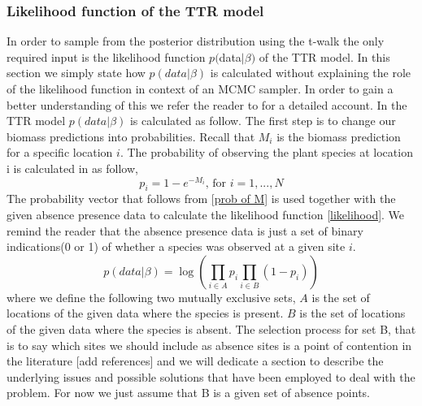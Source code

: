 \documentclass[paper=a4, fontsize=11pt]{scrartcl}
\numberwithin{equation}{section}		%
\numberwithin{figure}{section}			%
\numberwithin{table}{section}				%
\begin{document}
\subsubsection{Likelihood function of the TTR model}
In order to sample from the posterior distribution using the t-walk the only required input is the likelihood function $p($data$|\beta)$ of the TTR model. In this section we simply state how $p(data|\beta)$ is calculated without explaining the role of the likelihood function in context of an MCMC sampler. In order to gain a better understanding of this we refer the reader to \cite{GelmanBayesianAnalysis} for a detailed account. In the TTR model $p(data|\beta)$ is calculated as follow. The first step is to change our biomass predictions into probabilities. Recall that $M_i$ is the biomass prediction for a specific location $i$. The probability of observing the plant species at location i is calculated in \cite{Higgins2012APlants} as follow, 
\begin{equation}
p_i = 1 - e^{-M_i} \text{, for $i = 1,...,N$}
\label{prob of M}
\end{equation}  
The probability vector that follows from \ref{prob of M} is used together with the given absence presence data to calculate the likelihood function \ref{likelihood}. We remind the reader that the absence presence data is just a set of binary indications(0 or 1) of whether a species was observed at a given site $i$.   
\begin{equation}
p(data|\beta) = \log(\prod_{i \in A}p_i\prod_{i \in B}(1-p_i))
\label{likelihood}
\end{equation}  
where we define the following two mutually exclusive sets, 
$A$ is the set of locations of the given data where the species is present.
$B$ is the set of locations of the given data where the species is absent.
The selection process for set B, that is to say which sites we should include as absence sites is a point of contention in the literature [add references] and we will dedicate a section
to describe the underlying issues and possible solutions that have been employed to deal with the problem. For now we
just assume that B is a given set of absence points.
\end{document}

